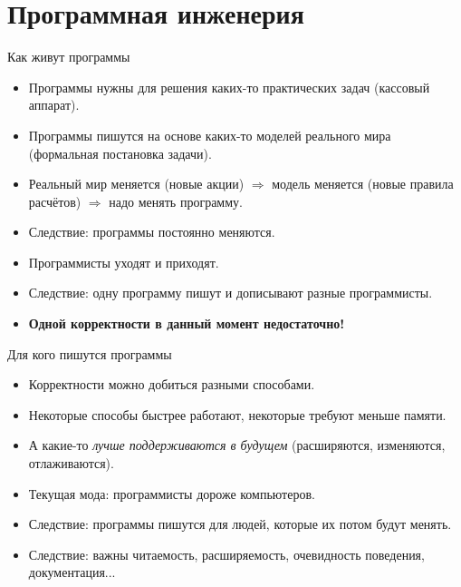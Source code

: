 \section{Программная инженерия}

\begin{frame}
	\tableofcontents[currentsection]
\end{frame}

\begin{frame}{Как живут программы}
	\begin{itemize}
		\item Программы нужны для решения каких-то практических задач (кассовый аппарат).
		\item Программы пишутся на основе каких-то моделей реального мира (формальная постановка задачи).
		\item Реальный мир меняется (новые акции) $\Rightarrow$ модель меняется (новые правила расчётов) $\Rightarrow$ надо менять программу.
		\item Следствие: программы постоянно меняются.
		\item Программисты уходят и приходят.
		\item Следствие: одну программу пишут и дописывают разные программисты.
		\item \textbf{Одной корректности в данный момент недостаточно!}
	\end{itemize}
\end{frame}

\begin{frame}{Для кого пишутся программы}
	\begin{itemize}
		\item Корректности можно добиться разными способами.
		\item Некоторые способы быстрее работают, некоторые требуют меньше памяти.
		\item А какие-то \textit{лучше поддерживаются в будущем} (расширяются, изменяются, отлаживаются).
		\item Текущая мода: программисты дороже компьютеров.
		\item Следствие: программы пишутся для людей, которые их потом будут менять.
		\item Следствие: важны читаемость, расширяемость, очевидность поведения, документация...
	\end{itemize}
\end{frame}

